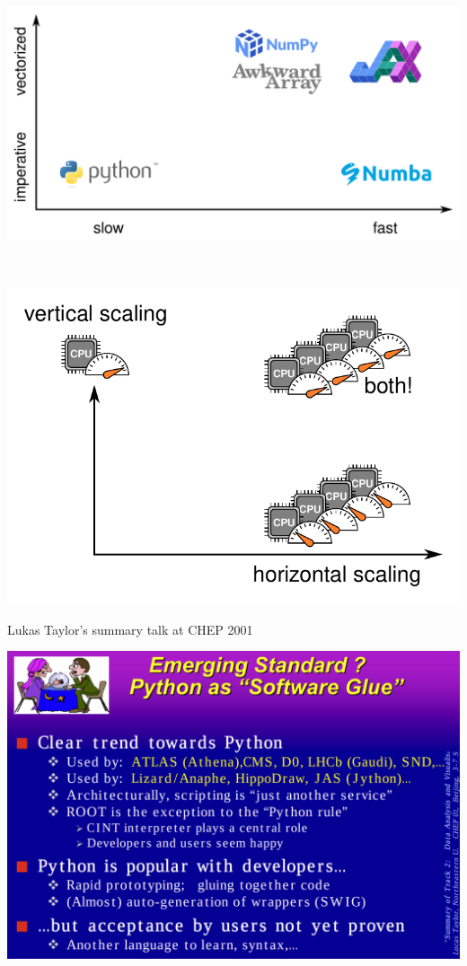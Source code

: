 \documentclass[aspectratio=169]{beamer}
\begin{document}
\begin{frame}{\mbox{ }}
\vspace{0.5 cm}
\begin{center}
\includegraphics[width=0.9\linewidth]{img/slow-fast-imperative-vectorized.pdf}
\end{center}
\end{frame}

\begin{frame}{\mbox{ }}
\vspace{0.75 cm}
\begin{center}
\includegraphics[width=0.6\linewidth]{img/horizontal-and-vertical-scaling.pdf}
\end{center}
\end{frame}

\begin{frame}{Lukas Taylor's summary talk at CHEP 2001}
\vspace{0.2 cm}
\begin{center}
\includegraphics[width=0.8\linewidth]{img/chep-2001-python.png}
\end{center}
\end{frame}
\end{document}
